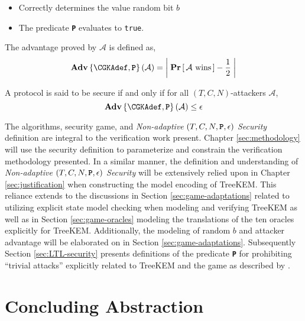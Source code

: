 \begin{itemize}
\item Correctly determines the value random bit \(b\)
\item The predicate \textbf{\texttt{P}} evaluates to \texttt{true}.
\end{itemize}

\begin{definition}
The advantage proved by $\mathcal{A}$ is defined as,
$$ \normalfont{\textbf{Adv}}\left\{\CGKAdef,\textbf{\texttt{P}}\right\}(\mathcal{A})  = \left|\; \textbf{Pr}\left[ \,\mathcal{A}\text{ wins}\, \right] - \frac{1}{2} \;\right| $$
\end{definition}

\begin{definition}  
\label{def:CGKA-Security}
A  protocol is said to be secure if and only if for all $(T, C, N)$-attackers $\mathcal{A}$,
$$ \normalfont\textbf{Adv}\left\{\CGKAdef,\textbf{\texttt{P}}\right\}(\mathcal{A}) \leq \epsilon $$
\end{definition}

The  algorithms, security game, and \emph{Non-adaptive} \((T, C, N, \textbf{\texttt{P}}, \epsilon)\) \emph{ Security} definition are integral to the verification work present.
Chapter \ref{sec:methodology} will use the security definition to parameterize and constrain the verification methodology presented.
In a similar manner, the definition and understanding of \emph{Non-adaptive} \((T, C, N, \textbf{\texttt{P}}, \epsilon)\) \emph{ Security} will be extensively relied upon in Chapter \ref{sec:justification} when constructing the model encoding of TreeKEM.
This reliance extends to the discussions in Section \ref{sec:game-adaptations} related to utilizing explicit state model checking when modeling and verifying TreeKEM
as well as in Section \ref{sec:game-oracles} modeling the translations of the ten \CGKAsec oracles explicitly for TreeKEM.
Additionally, the modeling of random \(b\) and attacker advantage will be elaborated on in Section \ref{sec:game-adaptations}.
Subsequently Section \ref{sec:LTL-security} presents definitions of the predicate \textbf{\texttt{P}} for prohibiting ``trivial attacks'' explicitly related to TreeKEM and the  game as described by \autocite{alwen2020security}.


\hypertarget{concluding-abstraction}{%
\section{Concluding Abstraction}\label{concluding-abstraction}}

